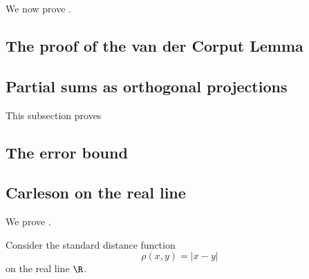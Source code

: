 We now prove .









\subsection{The proof of the van der Corput Lemma}
\label{10vandercorput}




\subsection{Partial sums as orthogonal projections}
\label{10projection}

This subsection proves 



\subsection{The error bound}
\label{10difference}

















\subsection{Carleson on the real line}
\label{10carleson}

We prove .

Consider the standard distance function
\begin{equation}
    \rho(x,y)=|x-y|
\end{equation}
on the real line $\R$.


